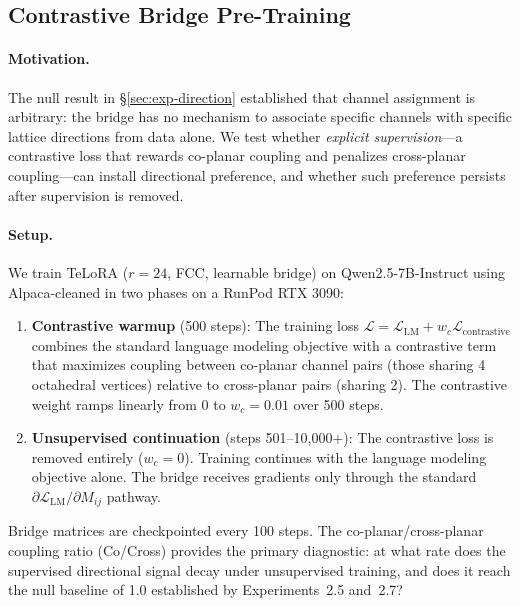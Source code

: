 \subsection{Contrastive Bridge Pre-Training}
\label{sec:exp-contrastive}

\paragraph{Motivation.}
The null result in \S\ref{sec:exp-direction} established that channel
assignment is arbitrary: the bridge has no mechanism to associate specific
channels with specific lattice directions from data alone. We test whether
\emph{explicit supervision}---a contrastive loss that rewards co-planar
coupling and penalizes cross-planar coupling---can install directional
preference, and whether such preference persists after supervision is
removed.

\paragraph{Setup.}
We train TeLoRA ($r\!=\!24$, FCC, learnable bridge) on
Qwen2.5-7B-Instruct using Alpaca-cleaned in two phases on a RunPod
RTX 3090:

\begin{enumerate}
\item \textbf{Contrastive warmup} (500 steps): The training loss
$\mathcal{L} = \mathcal{L}_\text{LM} + w_c \mathcal{L}_\text{contrastive}$
combines the standard language modeling objective with a contrastive term
that maximizes coupling between co-planar channel pairs (those sharing
4 octahedral vertices) relative to cross-planar pairs (sharing 2). The
contrastive weight ramps linearly from 0 to $w_c = 0.01$ over 500 steps.

\item \textbf{Unsupervised continuation} (steps 501--10,000+): The
contrastive loss is removed entirely ($w_c = 0$). Training continues
with the language modeling objective alone. The bridge receives gradients
only through the standard
$\partial\mathcal{L}_\text{LM}/\partial M_{ij}$ pathway.
\end{enumerate}

\noindent
Bridge matrices are checkpointed every 100 steps. The
co-planar/cross-planar coupling ratio (Co/Cross) provides the primary
diagnostic: at what rate does the supervised directional signal decay
under unsupervised training, and does it reach the null baseline of 1.0
established by Experiments~2.5 and~2.7?


